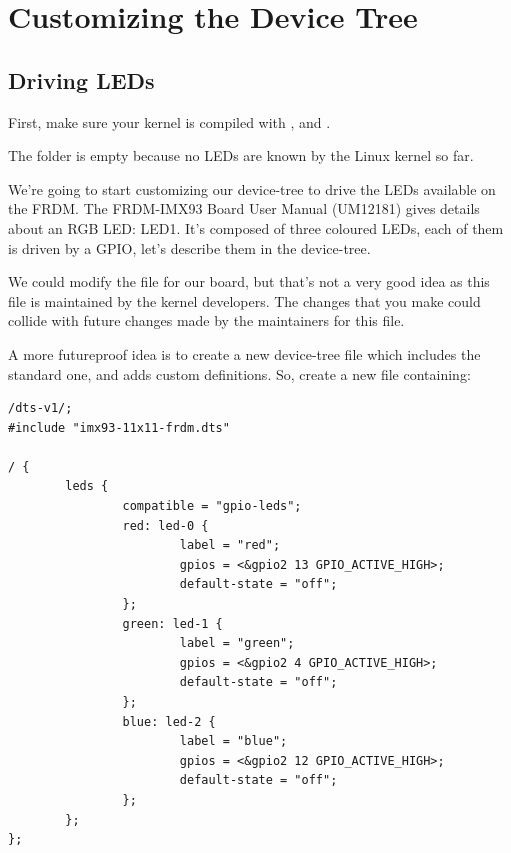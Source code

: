 \section{Customizing the Device Tree}

\subsection{Driving LEDs}

First, make sure your kernel is compiled with
, 
and .

The  folder is empty because no LEDs are known by the
Linux kernel so far.

We're going to start customizing our device-tree to drive the LEDs available
on the FRDM. The FRDM-IMX93 Board User Manual (UM12181) gives details about an
RGB LED: LED1. It's composed of three coloured LEDs, each of them is driven by
a GPIO, let's describe them in the device-tree.

We could modify the 
file for our board, but that's not a very good idea as this file is
maintained by the kernel developers. The changes that you make could
collide with future changes made by the maintainers for this file.

A more futureproof idea is to create a new device-tree file which
includes the standard one, and adds custom definitions. So, create a
new  file
containing:

\begin{verbatim}
/dts-v1/;
#include "imx93-11x11-frdm.dts"

/ {
        leds {
                compatible = "gpio-leds";
                red: led-0 {
                        label = "red";
                        gpios = <&gpio2 13 GPIO_ACTIVE_HIGH>;
                        default-state = "off";
                };
                green: led-1 {
                        label = "green";
                        gpios = <&gpio2 4 GPIO_ACTIVE_HIGH>;
                        default-state = "off";
                };
                blue: led-2 {
                        label = "blue";
                        gpios = <&gpio2 12 GPIO_ACTIVE_HIGH>;
                        default-state = "off";
                };
        };
};

\end{verbatim}

